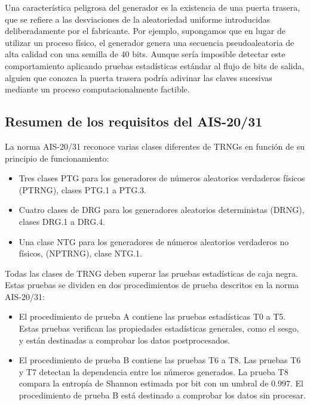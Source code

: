             Una característica peligrosa del generador es la existencia de una puerta trasera, que se refiere a las desviaciones de la aleatoriedad uniforme introducidas deliberadamente por el fabricante. Por ejemplo, supongamos que en lugar de utilizar un proceso físico, el generador genera una secuencia pseudoaleatoria de alta calidad con una semilla de 40 bits. Aunque sería imposible detectar este comportamiento aplicando pruebas estadísticas estándar al flujo de bits de salida, alguien que conozca la puerta trasera podría adivinar las claves sucesivas mediante un proceso computacionalmente factible. 

        \subsection{Resumen de los requisitos del AIS-20/31}

            La norma AIS-20/31 reconoce varias clases diferentes de TRNGs en función de su principio de funcionamiento:
            
            \begin{itemize}[noitemsep]
                \item Tres clases PTG para los generadores de números aleatorios verdaderos físicos (PTRNG), clases PTG.1 a PTG.3.
                \item Cuatro clases de DRG para los generadores aleatorios deterministas (DRNG), clases DRG.1 a DRG.4.
                \item Una clase NTG para los generadores de números aleatorios verdaderos no físicos, (NPTRNG), clase NTG.1.
            \end{itemize}
            
            Todas las clases de TRNG deben superar las pruebas estadísticas de caja negra. Estas pruebas se dividen en dos procedimientos de prueba descritos en la norma AIS-20/31:

            \begin{itemize}[noitemsep]
                \item El procedimiento de prueba A contiene las pruebas estadísticas T0 a T5. Estas pruebas verifican las propiedades estadísticas generales, como el sesgo, y están destinadas a comprobar los datos postprocesados.
                \item El procedimiento de prueba B contiene las pruebas T6 a T8. Las pruebas T6 y T7 detectan la dependencia entre los números generados. La prueba T8 compara la entropía de Shannon estimada por bit con un umbral de 0.997. El procedimiento de prueba B está destinado a comprobar los datos sin procesar.
            \end{itemize}		

